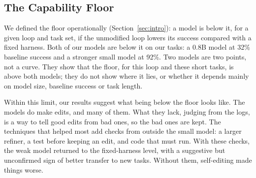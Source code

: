 \subsection{The Capability Floor}

We defined the floor operationally (Section~\ref{sec:intro}): a model is below it, for a given loop
and task set, if the unmodified loop lowers its success compared with a fixed harness. Both of our
models are below it on our tasks: a 0.8B model at 32\% baseline success and a stronger small model
at 92\%. Two models are two points, not a curve. They show that the floor, for this loop and these
short tasks, is above both models; they do not show where it lies, or whether it depends mainly on
model size, baseline success or task length.

Within this limit, our results suggest what being below the floor looks like. The models do make
edits, and many of them. What they lack, judging from the logs, is a way to tell good edits from bad
ones, so the bad ones are kept. The techniques that helped most add checks from outside the small
model: a larger refiner, a test before keeping an edit, and code that must run. With these checks,
the weak model returned to the fixed-harness level, with a suggestive but unconfirmed sign of better
transfer to new tasks. Without them, self-editing made things worse.
